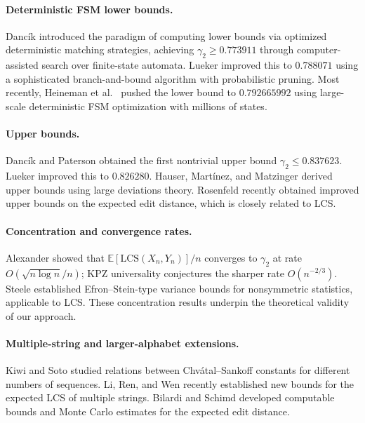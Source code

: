 \documentclass[11pt,a4paper]{article}
\theoremstyle{definition}
\newcommand{\E}{\mathbb{E}}
\newcommand{\LCS}{\mathrm{LCS}}
\begin{document}
\paragraph{Deterministic FSM lower bounds.}
Danc\'{i}k \citep{dancik1994} introduced the paradigm of computing lower bounds
via optimized deterministic matching strategies, achieving $\gamma_2 \geq
0.773911$ through computer-assisted search over finite-state automata. Lueker
\citep{lueker2009} improved this to $0.788071$ using a sophisticated
branch-and-bound algorithm with probabilistic pruning. Most recently, Heineman
et al.\ \citep{heineman2024} pushed the lower bound to $0.792665992$ using
large-scale deterministic FSM optimization with millions of states.

\paragraph{Upper bounds.}
Danc\'{i}k and Paterson \citep{dancik1995} obtained the first nontrivial upper
bound $\gamma_2 \leq 0.837623$. Lueker \citep{lueker2009} improved this to
$0.826280$. Hauser, Mart\'{i}nez, and Matzinger \citep{hauser2006} derived
upper bounds using large deviations theory. Rosenfeld \citep{rosenfeld2024}
recently obtained improved upper bounds on the expected edit distance, which is
closely related to LCS.

\paragraph{Concentration and convergence rates.}
Alexander \citep{alexander1994} showed that $\E[\LCS(X_n, Y_n)]/n$ converges to
$\gamma_2$ at rate $O(\sqrt{n\log n}/n)$; KPZ universality conjectures the
sharper rate $O(n^{-2/3})$.
Steele \citep{steele1986} established Efron--Stein-type variance bounds for
nonsymmetric statistics, applicable to LCS. These concentration results underpin
the theoretical validity of our approach.

\paragraph{Multiple-string and larger-alphabet extensions.}
Kiwi and Soto \citep{kiwi2008} studied relations between Chv\'{a}tal--Sankoff
constants for different numbers of sequences. Li, Ren, and Wen
\citep{li2025} recently established new bounds for the expected LCS of
multiple strings. Bilardi and Schimd \citep{bilardi2022} developed computable
bounds and Monte Carlo estimates for the expected edit distance.
\end{document}
